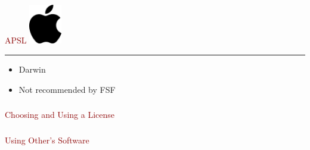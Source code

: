\documentclass[c]{beamer}
\newcommand{\TITLE}{\fontsize{50pt}{1em}\selectfont}
\begin{document}
  \begin{frame}
    \textcolor{darkred}{{\TITLE APSL}}
    \hfill \includegraphics[width=40pt]{apple} \\
    \vspace{1em} \hrule \vspace{1em}
    \LARGE
    \begin{itemize}
    \item Darwin
    \item Not recommended by FSF
    \end{itemize}
  \end{frame}
  \begin{frame}
    \frametitle{}
    \textcolor{darkred}{{\TITLE Choosing and Using a License \\}}
  \end{frame}
  \begin{frame}
    \frametitle{}
    \textcolor{darkred}{{\TITLE Using Other's Software \\}}
  \end{frame}

\end{document}
